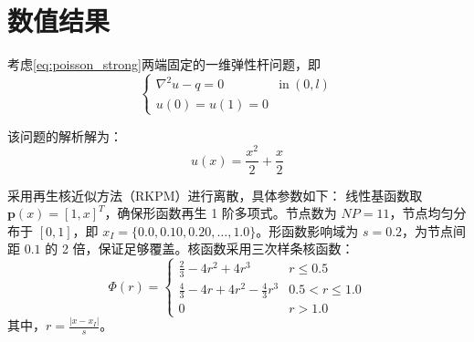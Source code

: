 \documentclass[engineeringmaster]{hquThesis}
\begin{document}
\section{数值结果}
考虑\eqref{eq:poisson_strong}两端固定的一维弹性杆问题，即
\[
    \left\{
    \begin{array}{ll}
        \nabla^2 u - q = 0 & \mathrm{in~} (0, l) \\
        u(0) =u(1)= 0 
    \end{array}
    \right.
    \label{eq:strong_form1}
\]


该问题的解析解为：
\begin{equation}
u(x) = \frac{x^2}{2} + \frac{x}{2}
\label{eq:analytical_solution}
\end{equation}

采用再生核近似方法（RKPM）进行离散，具体参数如下：
线性基函数取 \( \boldsymbol{p}(x) = [1, x]^T \)，确保形函数再生 1 阶多项式。节点数为 \( NP = 11 \)，节点均匀分布于 \( [0, 1] \)，即 \( x_I = \{0.0, 0.10,0.20, \ldots, 1.0\} \)。形函数影响域为 \( s = 0.2 \)，为节点间距 \( 0.1 \) 的 2 倍，保证足够覆盖。核函数采用三次样条核函数：
\begin{equation}
    \Phi(r) = 
    \begin{cases} 
    \frac{2}{3} - 4r^2 + 4r^3 & r \leq 0.5 \\
    \frac{4}{3} - 4r + 4r^2 - \frac{4}{3}r^3 & 0.5 < r \leq 1.0 \\
    0 & r > 1.0 
    \end{cases}
    \label{eq:cubic_spline}
\end{equation}
其中，\( r = \frac{|x - x_I|}{s} \)。
\end{document}
